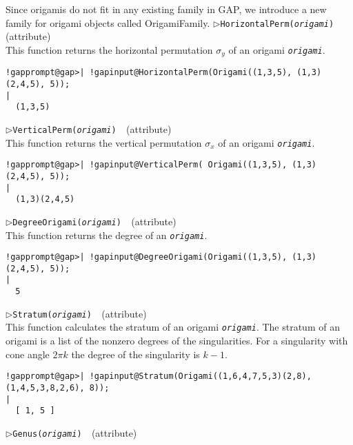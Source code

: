 \documentclass[a4paper,11pt]{report}
\begin{document}
{{{ Since origamis do not fit in any existing family in \textsf{GAP}, we introduce a new family for origami objects called OrigamiFamily. \noindent\textcolor{FuncColor}{$\triangleright$\enspace\texttt{HorizontalPerm({\mdseries\slshape origami})
\label{HorizontalPerm}
}\hfill{\scriptsize (attribute)}}\\


 This function returns the horizontal permutation $\sigma_y$ of an origami \mbox{\texttt{\mdseries\slshape origami}}. 
\begin{Verbatim}[commandchars=!@|,fontsize=\small,frame=single,label=Example]
  !gapprompt@gap>| !gapinput@HorizontalPerm(Origami((1,3,5), (1,3)(2,4,5), 5));
|
  (1,3,5)
\end{Verbatim}
 \noindent\textcolor{FuncColor}{$\triangleright$\enspace\texttt{VerticalPerm({\mdseries\slshape origami})
\label{VerticalPerm}
}\hfill{\scriptsize (attribute)}}\\


 This function returns the vertical permutation $\sigma_x$ of an origami \mbox{\texttt{\mdseries\slshape origami}}. 
\begin{Verbatim}[commandchars=!@|,fontsize=\small,frame=single,label=Example]
  !gapprompt@gap>| !gapinput@VerticalPerm( Origami((1,3,5), (1,3)(2,4,5), 5));
|
  (1,3)(2,4,5)
\end{Verbatim}
 \noindent\textcolor{FuncColor}{$\triangleright$\enspace\texttt{DegreeOrigami({\mdseries\slshape origami})
\label{DegreeOrigami}
}\hfill{\scriptsize (attribute)}}\\


 This function returns the degree of an \mbox{\texttt{\mdseries\slshape origami}}. 
\begin{Verbatim}[commandchars=!@|,fontsize=\small,frame=single,label=Example]
  !gapprompt@gap>| !gapinput@DegreeOrigami(Origami((1,3,5), (1,3)(2,4,5), 5));
|
  5
\end{Verbatim}
 \noindent\textcolor{FuncColor}{$\triangleright$\enspace\texttt{Stratum({\mdseries\slshape origami})
\label{Stratum}
}\hfill{\scriptsize (attribute)}}\\


 This function calculates the stratum of an origami \mbox{\texttt{\mdseries\slshape origami}}. The stratum of an origami is a list of the nonzero degrees of the
singularities. For a singularity with cone angle $2\pi k$ the degree of the singularity is $k-1$. 
\begin{Verbatim}[commandchars=!@|,fontsize=\small,frame=single,label=Example]
  !gapprompt@gap>| !gapinput@Stratum(Origami((1,6,4,7,5,3)(2,8), (1,4,5,3,8,2,6), 8));
|
  [ 1, 5 ]
\end{Verbatim}
 \noindent\textcolor{FuncColor}{$\triangleright$\enspace\texttt{Genus({\mdseries\slshape origami})
\label{Genus}
}\hfill{\scriptsize (attribute)}}\\


}}}
\end{document}
